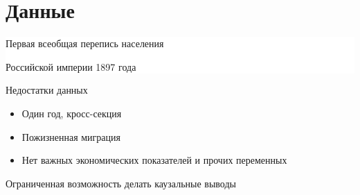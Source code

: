 \documentclass[aspectratio=169]{beamer}
\newcommand{\btVFill}{\vskip0pt plus 1filll}
\begin{document}
\section{Данные}
{
\begin{frame}[b]
\hfill \colorbox{white}{\parbox{0.64\textwidth}{Первая всеобщая перепись населения \par Российской империи 1897 года \citep{census_1897}}}
\bigskip
\end{frame}
}

\begin{frame}{Недостатки данных}

\begin{itemize}
	\item Один год, кросс-секция
	\item Пожизненная миграция
	\item Нет важных экономических показателей и прочих переменных
\end{itemize}
\par
Ограниченная возможность делать каузальные выводы

\end{frame}

%	
%
\end{document}
